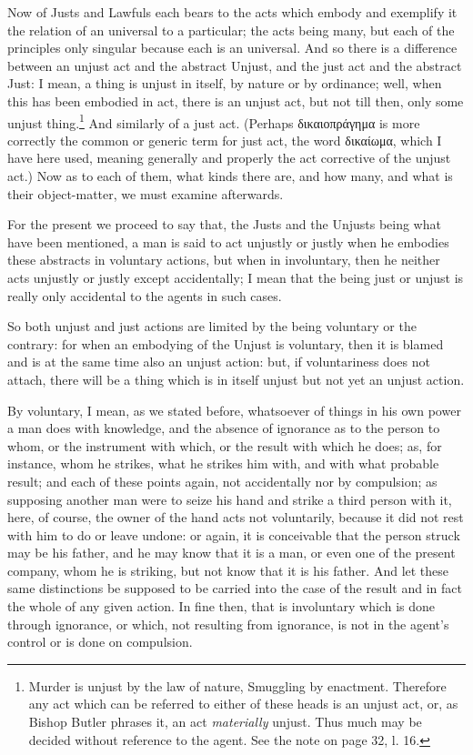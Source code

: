 
Now of Justs and Lawfuls each bears to the acts which embody and exemplify it
the relation of an universal to a particular; the acts being many, but each of
the principles only singular because each is an universal. And so there is a
difference between an unjust act and the abstract Unjust, and the just act and
the abstract Just: I mean, a thing is unjust in itself, by nature or by
ordinance; well, when this has been embodied in act, there is an unjust act,
but not till then, only some unjust thing.\footnote{Murder is unjust by the law of nature, Smuggling by enactment. Therefore any
act which can be referred to either of these heads is an unjust act, or, as
Bishop Butler phrases it, an act \emph{materially} unjust. Thus much may be
decided without reference to the agent. See the note on page 32, l. 16.}
And similarly of a just act. (Perhaps
δικαιοπράγημα
is more correctly the common or generic term for just act, the word
δικαίωμα, which I have here used,
meaning generally and properly the act corrective of the unjust act.) Now as to
each of them, what kinds there are, and how many, and what is their
object-matter, we must examine afterwards.

For the present we proceed to say that, the Justs and the Unjusts being what
have been mentioned, a man is said to act unjustly or justly when he embodies
these abstracts in voluntary actions, but when in involuntary, then he neither
acts unjustly or justly except accidentally; I mean that the being just or
unjust is really only accidental to the agents in such cases.

So both unjust and just actions are limited by the being voluntary or the
contrary: for when an embodying of the Unjust is voluntary, then it is blamed
and is at the same time also an unjust action: but, if voluntariness does not
attach, there will be a thing which is in itself unjust but not yet an unjust
action.

By voluntary, I mean, as we stated before, whatsoever of things in his own
power a man does with knowledge, and the absence of ignorance as to the person
to whom, or the instrument with which, or the result with which he does; as,
for instance, whom he strikes, what he strikes him with, and with what probable
result; and each of these points again, not accidentally nor by compulsion; as
supposing another man were to seize his hand and strike a third person with it,
here, of course, the owner of the hand acts not voluntarily, because it did not
rest with him to do or leave undone: or again, it is conceivable that the
person struck may be his father, and he may know that it is a man, or even one
of the present company, whom he is striking, but not know that it is his
father. And let these same distinctions be supposed to be carried into the case
of the result and in fact the whole of any given action. In fine then, that is
involuntary which is done through ignorance, or which, not resulting from
ignorance, is not in the agent’s control or is done on compulsion.

